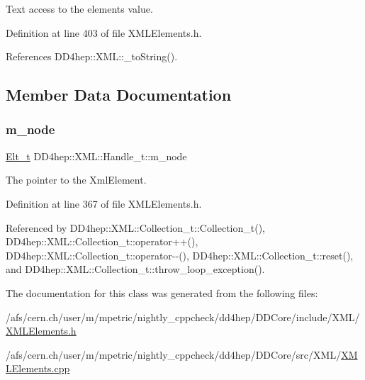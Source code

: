 Text access to the element\textquotesingle{}s value. 



Definition at line 403 of file X\+M\+L\+Elements.\+h.



References D\+D4hep\+::\+X\+M\+L\+::\+\_\+to\+String().



\subsection{Member Data Documentation}
\hypertarget{class_d_d4hep_1_1_x_m_l_1_1_handle__t_afa133bf6ff332a64464594429061f036}{}\label{class_d_d4hep_1_1_x_m_l_1_1_handle__t_afa133bf6ff332a64464594429061f036} 
\subsubsection{\texorpdfstring{m\+\_\+node}{m\_node}}
{\footnotesize\ttfamily \hyperlink{class_d_d4hep_1_1_x_m_l_1_1_handle__t_a81a72155f29971b37652430a334a6b30}{Elt\+\_\+t} D\+D4hep\+::\+X\+M\+L\+::\+Handle\+\_\+t\+::m\+\_\+node\hspace{0.3cm}{\ttfamily [mutable]}}



The pointer to the Xml\+Element. 



Definition at line 367 of file X\+M\+L\+Elements.\+h.



Referenced by D\+D4hep\+::\+X\+M\+L\+::\+Collection\+\_\+t\+::\+Collection\+\_\+t(), D\+D4hep\+::\+X\+M\+L\+::\+Collection\+\_\+t\+::operator++(), D\+D4hep\+::\+X\+M\+L\+::\+Collection\+\_\+t\+::operator-\/-\/(), D\+D4hep\+::\+X\+M\+L\+::\+Collection\+\_\+t\+::reset(), and D\+D4hep\+::\+X\+M\+L\+::\+Collection\+\_\+t\+::throw\+\_\+loop\+\_\+exception().



The documentation for this class was generated from the following files\+:\begin{DoxyCompactItemize}
\item 
/afs/cern.\+ch/user/m/mpetric/nightly\+\_\+cppcheck/dd4hep/\+D\+D\+Core/include/\+X\+M\+L/\hyperlink{_x_m_l_elements_8h}{X\+M\+L\+Elements.\+h}\item 
/afs/cern.\+ch/user/m/mpetric/nightly\+\_\+cppcheck/dd4hep/\+D\+D\+Core/src/\+X\+M\+L/\hyperlink{_x_m_l_elements_8cpp}{X\+M\+L\+Elements.\+cpp}\end{DoxyCompactItemize}
